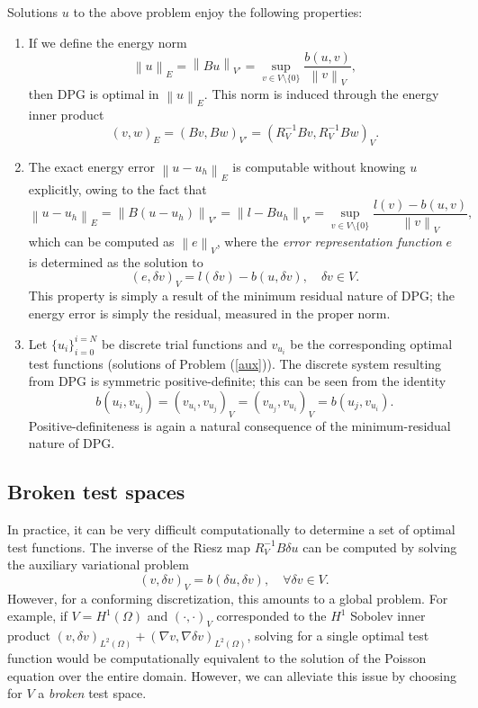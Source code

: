 \documentclass[11pt,onecolumn]{scrartcl}
\newcommand{\nor}[1]{\left\| #1 \right\|}
\newcommand{\LRp}[1]{\left( #1 \right)}
\newcommand{\grad}{\nabla}
\begin{document}
Solutions $u$ to the above problem enjoy the following properties: 
\begin{enumerate}
\item If we define the energy norm 
\[
\nor{u}_E = \nor{Bu}_{V'} = \sup_{v\in V\setminus\{0\}}\frac{b(u,v)}{\nor{v}_V},
\]
then DPG is optimal in $\nor{u}_E$.  This norm is induced through the energy inner product
\[
\LRp{v,w}_E = \LRp{Bv,Bw}_{V'} = \LRp{R_V^{-1}Bv, R_V^{-1}Bw}_V.
\]
\item The exact energy error $\nor{u-u_h}_E$ is computable without knowing $u$ explicitly, owing to the fact that
\[
\nor{u-u_h}_E = \nor{B(u-u_h)}_{V'} = \nor{l-Bu_h}_{V'} = \sup_{v\in V\setminus\{0\}}\frac{l(v)-b(u,v)}{\nor{v}_V},
\]
which can be computed as $\nor{e}_V$, where the \textit{error representation function} $e$ is determined as the solution to 
\[
\LRp{e,\delta v}_V = l(\delta v)-b(u,\delta v), \quad \delta v\in V.
\]
This property is simply a result of the minimum residual nature of DPG; the energy error is simply the residual, measured in the proper norm. 
\item Let $\{u_i\}_{i = 0}^{i = N}$ be discrete trial functions and $v_{u_i}$ be the corresponding optimal test functions (solutions of Problem (\ref{aux})).  The discrete system resulting from DPG is symmetric positive-definite; this can be seen from the identity
\[
b(u_i,v_{u_j}) = \LRp{v_{u_i},v_{u_j}}_V = \LRp{v_{u_j},v_{u_i}}_V = b(u_j,v_{u_i}).
\]
Positive-definiteness is again a natural consequence of the minimum-residual nature of DPG.  
\end{enumerate}

\subsection{Broken test spaces}

In practice, it can be very difficult computationally to determine a set of optimal test functions.  The inverse of the Riesz map $R_V^{-1} B\delta u$ can be computed by solving the auxiliary variational problem
\begin{equation}
\label{aux}
(v,\delta v)_V = b\LRp{\delta u,\delta v}, \quad \forall \delta v\in V.  
\end{equation}
However, for a conforming discretization, this amounts to a global problem.  For example, if $V = H^1(\Omega)$ and $\LRp{\cdot, \cdot }_V$ corresponded to the $H^1$ Sobolev inner product  $\LRp{v,\delta v}_{L^2(\Omega)} + \LRp{\grad v,\grad \delta v}_{L^2(\Omega)}$, solving for a single optimal test function would be computationally equivalent to the solution of the Poisson equation over the entire domain.  However, we can alleviate this issue by choosing for $V$ a \textit{broken} test space.
\end{document}
